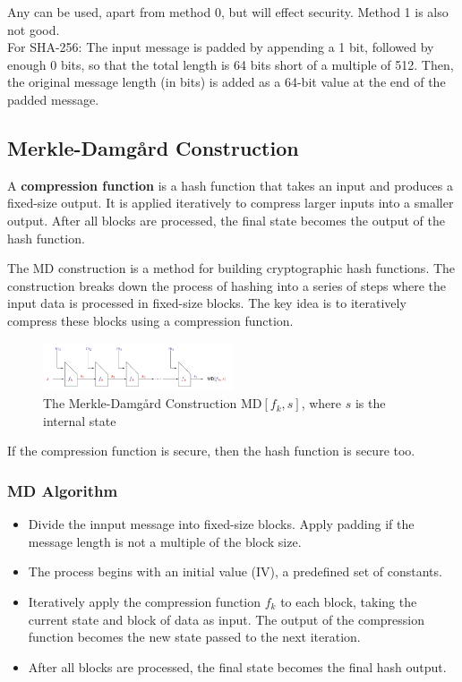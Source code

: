 Any can be used, apart from method 0, but will effect security. Method 1 is also not good. \\

For SHA-256: The input message is padded by appending a 1 bit, followed by enough 0 bits, so that the total length is 64 bits short of a multiple of 512. Then, the original message length (in bits) is added as a 64-bit value at the end of the padded message.

\subsection{Merkle-Damg\aa rd Construction}
\begin{defn}
    A \textbf{compression function} is a hash function that takes an input and produces a fixed-size output. It is applied iteratively to compress larger inputs into a smaller output. After all blocks are processed, the final state becomes the output of the hash function.
\end{defn}

The MD construction is a method for building cryptographic hash functions. The construction breaks down the process of hashing into a series of steps where the input data is processed in fixed-size blocks. The key idea is to iteratively compress these blocks using a compression function.

\begin{figure}[h!]
    \centering
    \includegraphics[width=0.5\textwidth]{img/MDconstruction.png}
    \caption{The Merkle-Damg\aa rd Construction MD$[f_k, s]$, where $s$ is the internal state}
\end{figure}

If the compression function is secure, then the hash function is secure too. 

\subsubsection{MD Algorithm}
\begin{itemize}
    \item Divide the innput message into fixed-size blocks. Apply padding if the message length is not a multiple of the block size.
    \item The process begins with an initial value (IV), a predefined set of constants.
    \item Iteratively apply the compression function $f_k$ to each block, taking the current state and block of data as input. The output of the compression function becomes the new state passed to the next iteration.
    \item After all blocks are processed, the final state becomes the final hash output.
\end{itemize}

